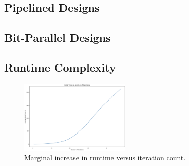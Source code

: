 \subsection{Pipelined Designs}\label{sec:results:retiming}

\subsection{Bit-Parallel Designs}\label{sec:results:scalability}

\subsection{Runtime Complexity}\label{sec:results:complexity}
\begin{figure}
    \centering
    \includegraphics[width=0.47\textwidth]{img/runtime.png}
    \caption{Marginal increase in runtime versus iteration count.}\label{fig:runtime}
    \Description[]{}
\end{figure}